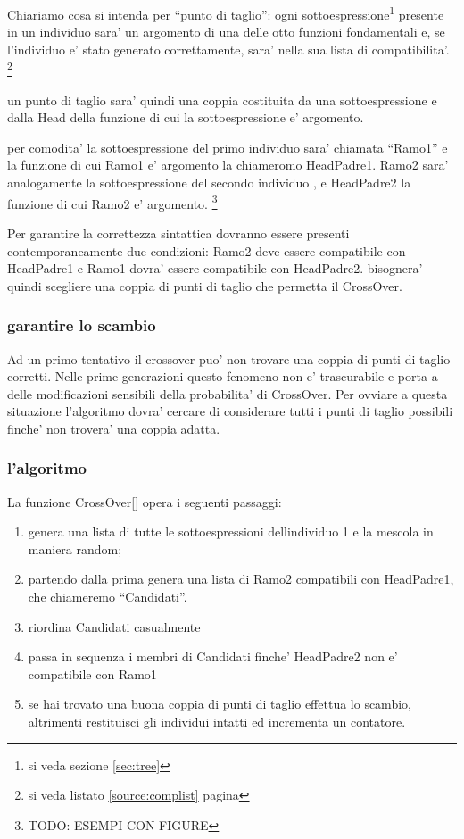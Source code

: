 \documentclass[12pt, a4paper]{article}
\begin{document}
Chiariamo cosa si intenda per ``punto di taglio'': ogni sottoespressione\footnote{si veda sezione \ref{sec:tree}} presente in un individuo sara' un argomento di una delle otto funzioni fondamentali e, se l'individuo e' stato generato correttamente, sara' nella sua lista di compatibilita'.
\footnote{si veda listato \ref{source:complist} pagina \pageref{source:complist}} 

un punto di taglio sara' quindi una coppia costituita da una sottoespressione e dalla Head della funzione di cui la sottoespressione e' argomento.

per comodita' la sottoespressione del primo individuo sara' chiamata ``Ramo1'' e la funzione di cui Ramo1 e' argomento la chiameromo HeadPadre1.
Ramo2 sara' analogamente la sottoespressione del secondo individuo , e HeadPadre2 la funzione di cui Ramo2 e' argomento.
\footnote{TODO: ESEMPI CON FIGURE}

Per garantire la correttezza sintattica dovranno essere presenti contemporaneamente due condizioni:
Ramo2 deve essere compatibile con HeadPadre1 e Ramo1 dovra' essere compatibile con HeadPadre2.
bisognera' quindi scegliere una coppia di punti di taglio che permetta il CrossOver.

\subsubsection{garantire lo scambio}
Ad un primo tentativo il crossover puo' non trovare una coppia di punti di taglio corretti. Nelle prime generazioni questo fenomeno non e' trascurabile e porta a delle modificazioni sensibili della probabilita' di CrossOver. Per ovviare a questa situazione l'algoritmo dovra' cercare di considerare tutti i punti di taglio possibili finche' non trovera' una coppia adatta.

\subsubsection{l'algoritmo}
La funzione CrossOver[] opera i seguenti passaggi:
\begin{enumerate}
\item genera una lista di tutte le sottoespressioni dellindividuo 1 e la mescola in maniera random;
\item partendo dalla prima genera una lista di Ramo2 compatibili con HeadPadre1, che chiameremo ``Candidati''.
\item riordina Candidati casualmente
\item passa in sequenza i membri di Candidati finche' HeadPadre2 non e' compatibile con Ramo1
\item se hai trovato una buona coppia di punti di taglio effettua lo scambio, altrimenti restituisci gli individui intatti ed incrementa un contatore.
\end{enumerate}
\end{document}
